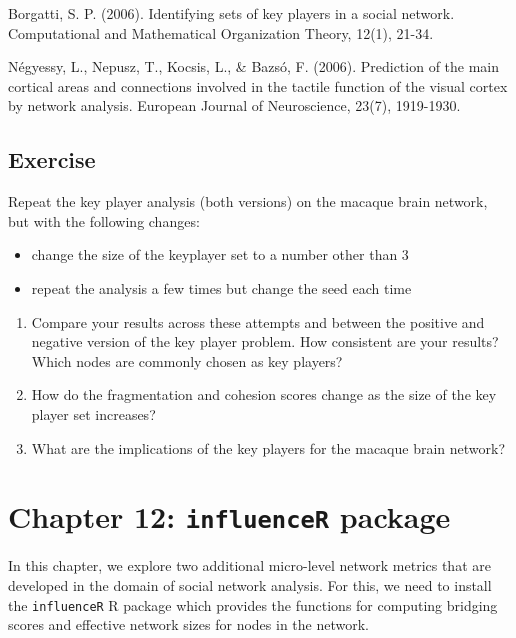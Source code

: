 \documentclass[
]{book}
\providecommand{\tightlist}{%
  \setlength{\itemsep}{0pt}\setlength{\parskip}{0pt}}
\begin{document}
Borgatti, S. P. (2006). Identifying sets of key players in a social network. Computational and Mathematical Organization Theory, 12(1), 21-34.

Négyessy, L., Nepusz, T., Kocsis, L., \& Bazsó, F. (2006). Prediction of the main cortical areas and connections involved in the tactile function of the visual cortex by network analysis. European Journal of Neuroscience, 23(7), 1919-1930.

\section{Exercise}\label{exercise-7}

Repeat the key player analysis (both versions) on the macaque brain network, but with the following changes:

\begin{itemize}
\tightlist
\item
  change the size of the keyplayer set to a number other than 3
\item
  repeat the analysis a few times but change the seed each time
\end{itemize}

\begin{enumerate}
\def\labelenumi{\arabic{enumi}.}
\tightlist
\item
  Compare your results across these attempts and between the positive and negative version of the key player problem. How consistent are your results? Which nodes are commonly chosen as key players?
\item
  How do the fragmentation and cohesion scores change as the size of the key player set increases?
\item
  What are the implications of the key players for the macaque brain network?
\end{enumerate}

\chapter{\texorpdfstring{Chapter 12: \texttt{influenceR} package}{Chapter 12: influenceR package}}\label{ch12}

In this chapter, we explore two additional micro-level network metrics that are developed in the domain of social network analysis. For this, we need to install the \texttt{influenceR} R package which provides the functions for computing bridging scores and effective network sizes for nodes in the network.
\end{document}
